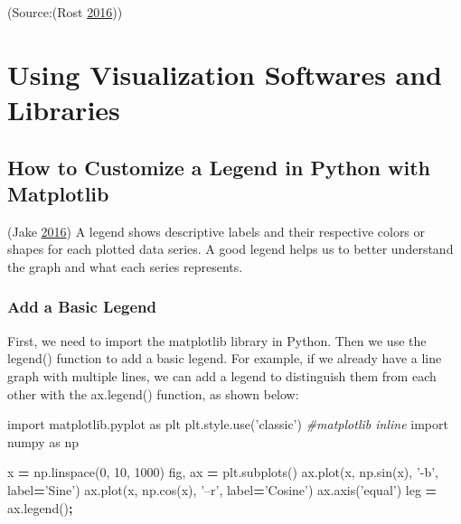 \documentclass[]{book}
\newenvironment{Shaded}{\begin{snugshade}}{\end{snugshade}}
\newcommand{\CommentTok}[1]{\textcolor[rgb]{0.56,0.35,0.01}{\textit{#1}}}
\newcommand{\DecValTok}[1]{\textcolor[rgb]{0.00,0.00,0.81}{#1}}
\newcommand{\ImportTok}[1]{#1}
\newcommand{\NormalTok}[1]{#1}
\newcommand{\OperatorTok}[1]{\textcolor[rgb]{0.81,0.36,0.00}{\textbf{#1}}}
\newcommand{\StringTok}[1]{\textcolor[rgb]{0.31,0.60,0.02}{#1}}
\begin{document}
(Source:(Rost \protect\hyperlink{ref-different_tools}{2016}))

\hypertarget{using-visualization-softwares-and-libraries}{%
\section{Using Visualization Softwares and Libraries}\label{using-visualization-softwares-and-libraries}}

\hypertarget{how-to-customize-a-legend-in-python-with-matplotlib}{%
\subsection{How to Customize a Legend in Python with Matplotlib}\label{how-to-customize-a-legend-in-python-with-matplotlib}}

(Jake \protect\hyperlink{ref-PythonDataScienceHandbook}{2016})
A legend shows descriptive labels and their respective colors or shapes for each plotted data series. A good legend helps us to better understand the graph and what each series represents.

\hypertarget{add-a-basic-legend}{%
\subsubsection{Add a Basic Legend}\label{add-a-basic-legend}}

First, we need to import the matplotlib library in Python. Then we use the legend() function to add a basic legend. For example, if we already have a line graph with multiple lines, we can add a legend to distinguish them from each other with the ax.legend() function, as shown below:

\begin{Shaded}
\begin{Highlighting}[]
\ImportTok{import}\NormalTok{ matplotlib.pyplot }\ImportTok{as}\NormalTok{ plt}
\NormalTok{plt.style.use(}\StringTok{'classic'}\NormalTok{)}
\CommentTok{#matplotlib inline}
\ImportTok{import}\NormalTok{ numpy }\ImportTok{as}\NormalTok{ np}

\NormalTok{x }\OperatorTok{=}\NormalTok{ np.linspace(}\DecValTok{0}\NormalTok{, }\DecValTok{10}\NormalTok{, }\DecValTok{1000}\NormalTok{)}
\NormalTok{fig, ax }\OperatorTok{=}\NormalTok{ plt.subplots()}
\NormalTok{ax.plot(x, np.sin(x), }\StringTok{'-b'}\NormalTok{, label}\OperatorTok{=}\StringTok{'Sine'}\NormalTok{)}
\NormalTok{ax.plot(x, np.cos(x), }\StringTok{'--r'}\NormalTok{, label}\OperatorTok{=}\StringTok{'Cosine'}\NormalTok{)}
\NormalTok{ax.axis(}\StringTok{'equal'}\NormalTok{)}
\NormalTok{leg }\OperatorTok{=}\NormalTok{ ax.legend()}\OperatorTok{;}
\end{Highlighting}
\end{Shaded}
\end{document}

